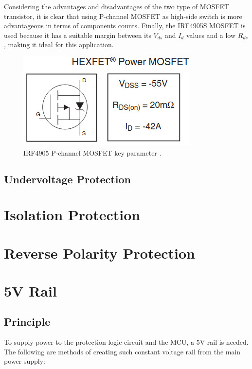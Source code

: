 \documentclass[../main.tex]{subfiles}
\begin{document}
    \justify
    Considering the advantages and disadvantages of the two type of MOSFET transistor, it is clear that using P-channel MOSFET as high-side switch is more advantageous in terms of components counts. Finally, the IRF4905S MOSFET is used because it has a suitable margin between its $V_{ds}$ and $I_{d}$ values and a low $R_{ds}$, making it ideal for this application. 

    \begin{figure}[!h]
        \centerline{\includegraphics[scale=0.5]{media/IRF4905_key_parameters.png}}
        \caption{IRF4905 P-channel MOSFET key parameter \cite{IRF4905S}.}
        \label{fig:IRF4905S_param}
    \end{figure}    

    \subsection{Undervoltage Protection}
    
    \section{Isolation Protection}

    \section{Reverse Polarity Protection}

    \pagebreak

    \section{5V Rail}

    \subsection{Principle}
    \justify
    To supply power to the protection logic circuit and the MCU, a 5V rail is needed. The following are methods of creating such constant voltage rail from the main power supply:
\end{document}
